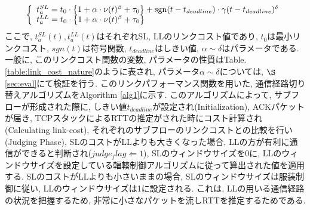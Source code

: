 \begin{eqnarray}
\left\{
\begin{array}{l}
t_{a}^{SL} = t_0 \cdot \bigl\{ 1 + \alpha \cdot \nu(t)^\beta + \tau_0 \bigr\} +
{\rm sgn} (t - t_{deadline}) \cdot \gamma (t - t_{deadline})^\delta \\
t_{a}^{LL} = t_0 \cdot \bigl\{ 1 + \alpha \cdot \nu(t)^\beta + \tau_0 \bigr\} 
\end{array}
\right.
\end{eqnarray} 
ここで, $t^{SL}_a(t), t^{LL}_a(t)$はそれぞれSL, LLのリンクコスト値であり, $t_0$は最小リンクコスト,
$sgn(t)$は符号関数, $t_{deadline}$はしきい値, $\alpha \sim \delta$はパラメータである.
一般に, このリンクコスト関数の変数, パラメータの性質はTable. \ref{table:link_cost_nature}のように表され,
パラメータ$\alpha \sim \delta$については, $\S$\ref{sec:eval}にて検証を行う. 
このリンクパフォーマンス関数を用いた, 通信経路切り替えアルゴリズムをAlgorithm \ref{alg1}に示す. 
このアルゴリズムによって, サブフローが形成された際に, しきい値$t_{deadline}$が設定され(Initialization),
ACKパケットが届き, TCPスタックによるRTTの推定がされた時にコスト計算され(Calculating link-cost),
それぞれのサブフローのリンクコストとの比較を行い(Judging Phase), SLのコストがLLよりも大きくなった場合,
LLの方が有利に通信ができると判断され($judge_flag \Leftarrow 1$), SLのウィンドウサイズを0に,
LLのウィンドウサイズを設定している輻輳制御アルゴリズムに従って算出された値を適用する. 
SLのコストがLLよりも小さいままの場合, SLのウィンドウサイズは服装制御に従い, LLのウィンドウサイズは1に設定される. 
これは, LLの用いる通信経路の状況を把握するため, 非常に小さなパケットを流しRTTを推定するためである. 


